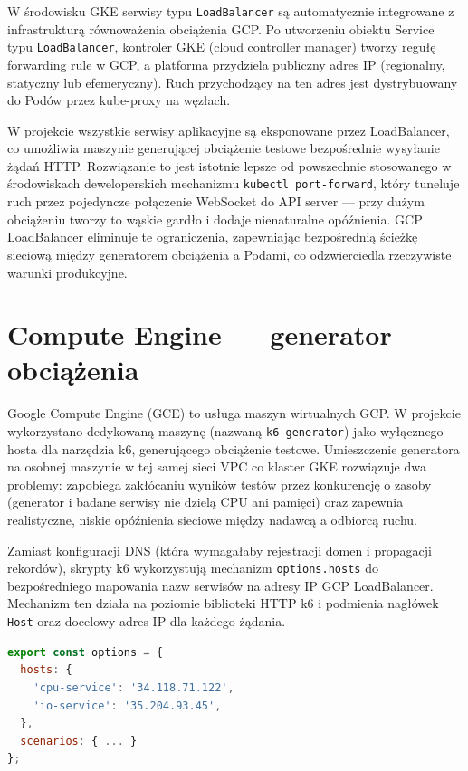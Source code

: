 W środowisku GKE serwisy typu \texttt{LoadBalancer} są automatycznie integrowane z infrastrukturą równoważenia obciążenia GCP. Po utworzeniu obiektu Service typu \texttt{LoadBalancer}, kontroler GKE (cloud controller manager) tworzy regułę forwarding rule w GCP, a platforma przydziela publiczny adres IP (regionalny, statyczny lub efemeryczny). Ruch przychodzący na ten adres jest dystrybuowany do Podów przez kube-proxy na węzłach.

W projekcie wszystkie serwisy aplikacyjne są eksponowane przez LoadBalancer, co umożliwia maszynie generującej obciążenie testowe bezpośrednie wysyłanie żądań HTTP. Rozwiązanie to jest istotnie lepsze od powszechnie stosowanego w środowiskach deweloperskich mechanizmu \texttt{kubectl port-forward}, który tuneluje ruch przez pojedyncze połączenie WebSocket do API server --- przy dużym obciążeniu tworzy to wąskie gardło i dodaje nienaturalne opóźnienia. GCP LoadBalancer eliminuje te ograniczenia, zapewniając bezpośrednią ścieżkę sieciową między generatorem obciążenia a Podami, co odzwierciedla rzeczywiste warunki produkcyjne.

\section{Compute Engine --- generator obciążenia}

Google Compute Engine (GCE) to usługa maszyn wirtualnych GCP. W projekcie wykorzystano dedykowaną maszynę (nazwaną \texttt{k6-generator}) jako wyłącznego hosta dla narzędzia k6, generującego obciążenie testowe. Umieszczenie generatora na osobnej maszynie w tej samej sieci VPC co klaster GKE rozwiązuje dwa problemy: zapobiega zakłócaniu wyników testów przez konkurencję o zasoby (generator i badane serwisy nie dzielą CPU ani pamięci) oraz zapewnia realistyczne, niskie opóźnienia sieciowe między nadawcą a odbiorcą ruchu.

Zamiast konfiguracji DNS (która wymagałaby rejestracji domen i propagacji rekordów), skrypty k6 wykorzystują mechanizm \texttt{options.hosts} do bezpośredniego mapowania nazw serwisów na adresy IP GCP LoadBalancer. Mechanizm ten działa na poziomie biblioteki HTTP k6 i podmienia nagłówek \texttt{Host} oraz docelowy adres IP dla każdego żądania.

\begin{lstlisting}[language=javascript, caption={Mapowanie hostów w opcjach skryptu k6}, label={lst:k6-hosts-mapping}]
export const options = {
  hosts: {
    'cpu-service': '34.118.71.122',
    'io-service': '35.204.93.45',
  },
  scenarios: { ... }
};
\end{lstlisting}

